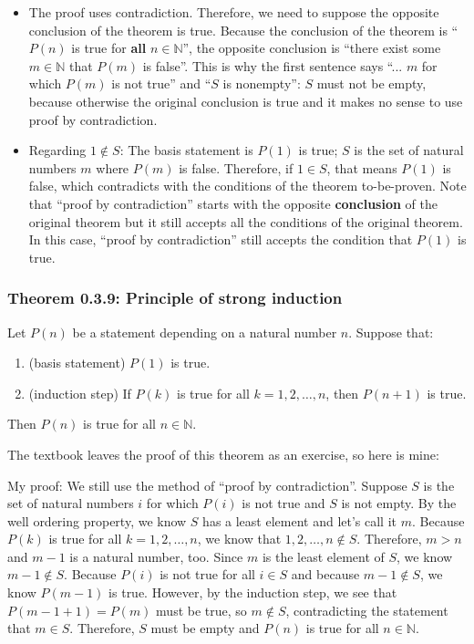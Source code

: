 \documentclass[12pt, letterpaper, oneside]{book}
\begin{document}
\begin{itemize}
  \item The proof uses contradiction. Therefore, we need to suppose the opposite
    conclusion of the theorem is true. Because the conclusion of the theorem is
    ``$P(n)$ is true for \textbf{all} $n \in \mathbb{N}$'', the opposite
    conclusion is ``there exist some $m \in \mathbb{N}$ that $P(m)$ is false''.
    This is why the first sentence says ``... $m$ for which $P(m)$ is not true''
    and ``$S$ is nonempty'': $S$ must not be empty, because otherwise the
    original conclusion is true and it makes no sense to use proof by
    contradiction.
  \item Regarding $1 \notin S$: The basis statement is $P(1)$ is true; $S$ is
    the set of natural numbers $m$ where $P(m)$ is false. Therefore, if $1 \in
    S$, that means $P(1)$ is false, which contradicts with the conditions of
    the theorem to-be-proven. Note that ``proof by contradiction'' starts with
    the opposite \textbf{conclusion} of the original theorem but it still
    accepts all the conditions of the original theorem. In this case, ``proof
    by contradiction'' still accepts the condition that $P(1)$ is true.
\end{itemize}

\subsubsection*{Theorem 0.3.9: Principle of strong induction}

Let $P(n)$ be a statement depending on a natural number $n$. Suppose that:

\begin{enumerate}
  \item (basis statement) $P(1)$ is true.
  \item (induction step) If $P(k)$ is true for all $k = 1, 2, \ldots, n$, then
    $P(n+1)$ is true.
\end{enumerate}

Then $P(n)$ is true for all $n \in \mathbb{N}$.

The textbook leaves the proof of this theorem as an exercise, so here is mine:

My proof: We still use the method of ``proof by contradiction''. Suppose $S$ is
the set of natural numbers $i$ for which $P(i)$ is not true and $S$ is not
empty. By the well ordering property, we know $S$ has a least element and let's
call it $m$. Because $P(k)$ is true for all $k = 1, 2, \ldots, n$, we know that
$1, 2, \ldots, n \notin S$. Therefore, $m > n$ and $m-1$ is a natural number,
too. Since $m$ is the least element of $S$, we know $m-1 \notin S$. Because
$P(i)$ is not true for all $i \in S$ and because $m-1 \notin S$, we know
$P(m-1)$ is true. However, by the induction step, we see that $P(m-1+1) = P(m)$
must be true, so $m \notin S$, contradicting the statement that $m \in S$.
Therefore, $S$ must be empty and $P(n)$ is true for all $n \in \mathbb{N}$.
\end{document}
